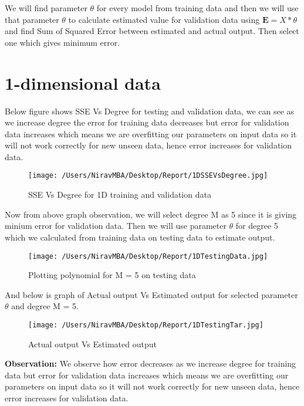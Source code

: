 \documentclass[12pt]{report}
\begin{document}
We will find parameter $ {\theta } $ for every model from training data and then we will use that parameter $ {\theta } $ to calculate estimated value for validation data using $ \mathbf{E} = {X}*{\theta } $ and find Sum of Squared Error between estimated and actual output. Then select one which gives minimum error.\\


\section{1-dimensional data}


Below figure shows SSE Vs Degree for testing and validation data, we can see as we increase degree the error for training data decreases but error for validation data increases which means we are overfitting our parameters on input data so it will not work correctly for new unseen data, hence error increases for validation data.\\

\begin{figure}[H]
	
	\texttt{[image: /Users/NiravMBA/Desktop/Report/1DSSEVsDegree.jpg]}
	\caption{SSE Vs Degree for 1D training and validation data}
\end{figure}

Now from above graph observation, we will select degree M as 5 since it is giving minium error for validation data. Then we will use parameter $ {\theta } $ for degree 5 which we calculated from training data on testing data to estimate output.\\

\begin{figure}[H]
	\centering
	\texttt{[image: /Users/NiravMBA/Desktop/Report/1DTestingData.jpg]}
	\caption{Plotting polynomial for M = 5 on testing data}
\end{figure}

And below is graph of Actual output Vs Estimated output for selected parameter $ {\theta } $ and degree M = 5.

\begin{figure}[H]
	
	\texttt{[image: /Users/NiravMBA/Desktop/Report/1DTestingTar.jpg]}
	\caption{Actual output Vs Estimated output}
\end{figure}


{\bfseries Observation: } 
We observe how error decreases as we increase degree for training data but error for validation data increases which means we are overfitting our parameters on input data so it will not work correctly for new unseen data, hence error increases for validation data.
\end{document}
